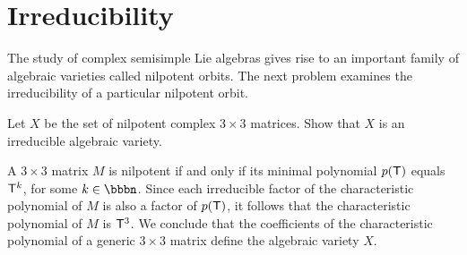\section{Irreducibility}

The study of complex semisimple Lie algebras gives rise to an
important family of algebraic varieties called nilpotent
orbits.  The next problem examines the
irreducibility of a particular nilpotent
orbit.

\begin{problem*} 
Let $X$ be the set of nilpotent complex $3 \times 3$ matrices.  Show
that $X$ is an irreducible algebraic variety.
\end{problem*}

\begin{solution*}
A $3 \times 3$ matrix $M$ is nilpotent if and only if its minimal
polynomial $p(\sf T)$ equals ${\sf T}^{k}$, for some $k \in \bbbn$.
Since each irreducible factor of the characteristic polynomial of $M$
is also a factor of $p(\sf T)$, it follows that the characteristic
polynomial of $M$ is ${\sf T}^{3}$.  We conclude that the coefficients
of the characteristic polynomial of a generic $3 \times 3$ matrix
define the algebraic variety $X$.


\end{solution*}
